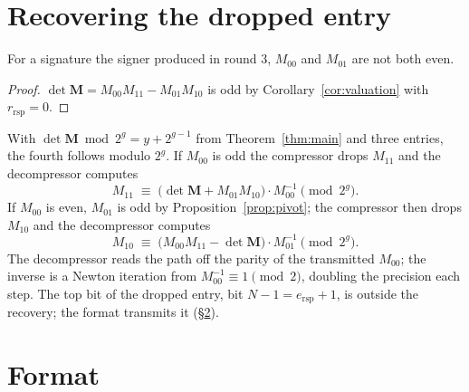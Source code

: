 \documentclass[version=preprint,notanonymous]{iacrcc}
\newcommand{\ers}{e_{\mathrm{rsp}}}
\newcommand{\rrs}{r_{\mathrm{rsp}}}
\newcommand{\Mm}{\mathbf{M}}
\begin{document}
\section{Recovering the dropped entry}
\label{sec:recover}

\begin{proposition}
\label{prop:pivot}
For a signature the signer produced in round 3, $M_{00}$ and $M_{01}$ are
not both even.
\end{proposition}

\begin{proof}
$\det \Mm = M_{00} M_{11} - M_{01} M_{10}$ is odd by
Corollary~\ref{cor:valuation} with $\rrs = 0$.
\end{proof}

With $\det \Mm \bmod 2^g = y + 2^{g - 1}$ from Theorem~\ref{thm:main}
and three entries, the fourth follows modulo $2^g$. If $M_{00}$ is odd
the compressor drops $M_{11}$ and the decompressor computes
\begin{equation}
\label{eq:m11}
  M_{11} \;\equiv\; \bigl(\det \Mm + M_{01} M_{10}\bigr) \cdot M_{00}^{-1}
  \pmod{2^{g}}.
\end{equation}
If $M_{00}$ is even, $M_{01}$ is odd by Proposition~\ref{prop:pivot};
the compressor then drops $M_{10}$ and the decompressor computes
\begin{equation}
\label{eq:m10}
  M_{10} \;\equiv\; \bigl(M_{00} M_{11} - \det \Mm\bigr) \cdot M_{01}^{-1}
  \pmod{2^{g}}.
\end{equation}
The decompressor reads the path off the parity of the transmitted
$M_{00}$; the inverse is a Newton iteration from $M_{00}^{-1} \equiv 1
\pmod 2$, doubling the precision each step. The top bit of the dropped
entry, bit $N - 1 = \ers + 1$, is outside the recovery; the format
transmits it (\S\ref{sec:format}).

\section{Format}
\label{sec:format}
\end{document}
